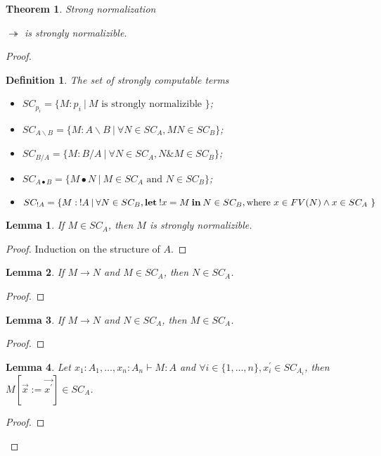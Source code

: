 \documentclass[a4paper]{article}
\newtheorem{theorem}{Theorem}
\newtheorem{lemma}{Lemma}
\newtheorem{defin}{Definition}
\begin{document}
\begin{theorem} Strong normalization
  $ $

  $\twoheadrightarrow$ is strongly normalizible.
\end{theorem}

\begin{proof}

\begin{defin} The set of strongly computable terms
  \begin{itemize}
    \item $SC_{p_i} = \{ M : p_i \: | \: M \text{ is strongly normalizible } \}$;
    \item $SC_{A \backslash B} = \{ M : A \backslash B \: | \: \forall N \in SC_{A}, M N \in SC_{B} \}$;
    \item $SC_{B / A} = \{ M : B / A \: | \: \forall N \in SC_{A}, N \& M \in SC_{B} \}$;
    \item $SC_{A \bullet B} = \{ M \bullet N \: | \: M \in SC_{A} \text{ and } N \in SC_{B}\}$;
    \item $SC_{!A} = \{ M : \: !A \: | \: \forall N \in SC_{B}, {\bf let \:} !x = M {\: \bf in \:} N \in SC_B, \text{where $x \in FV(N) \wedge x \in SC_{A}$ }\}$
  \end{itemize}
\end{defin}

\begin{lemma}

  If $M \in SC_A$, then $M$ is strongly normalizible.
\end{lemma}

\begin{proof}
  Induction on the structure of $A$.
\end{proof}

\begin{lemma}

  If $M \to N$ and $M \in SC_A$, then $N \in SC_A$.
\end{lemma}

\begin{proof}
\end{proof}


\begin{lemma} If $M \to N$ and $N \in SC_A$, then $M \in SC_A$.
\end{lemma}

\begin{proof}
\end{proof}

\begin{lemma} Let $x_1 : A_1, \dots, x_n : A_n \vdash M : A$ and $\forall i \in \{ 1, \dots, n\}, x^{'}_i \in SC_{A_i}$, then
  $M [\vec{x} := \vec{x^{'}}] \in SC_A$.
\end{lemma}

\begin{proof}
\end{proof}

\end{proof}
\end{document}
